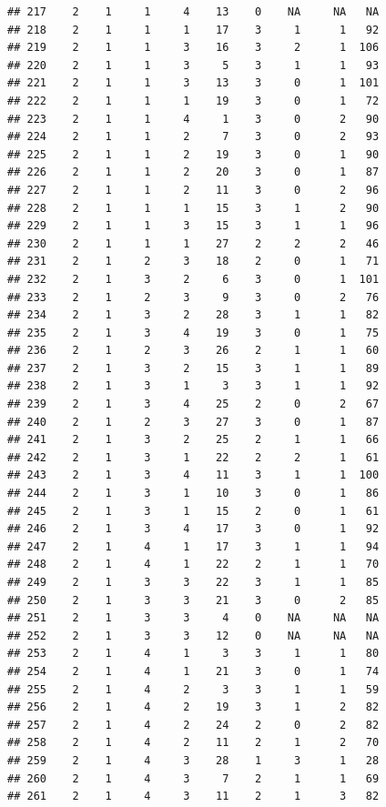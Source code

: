 \documentclass[krantz2,ChapterTOCs]{krantz}\usepackage{knitr}
\begin{document}
\begin{knitrout}
\begin{kframe}
\begin{verbatim}
## 217    2    1     1     4    13    0    NA     NA   NA
## 218    2    1     1     1    17    3     1      1   92
## 219    2    1     1     3    16    3     2      1  106
## 220    2    1     1     3     5    3     1      1   93
## 221    2    1     1     3    13    3     0      1  101
## 222    2    1     1     1    19    3     0      1   72
## 223    2    1     1     4     1    3     0      2   90
## 224    2    1     1     2     7    3     0      2   93
## 225    2    1     1     2    19    3     0      1   90
## 226    2    1     1     2    20    3     0      1   87
## 227    2    1     1     2    11    3     0      2   96
## 228    2    1     1     1    15    3     1      2   90
## 229    2    1     1     3    15    3     1      1   96
## 230    2    1     1     1    27    2     2      2   46
## 231    2    1     2     3    18    2     0      1   71
## 232    2    1     3     2     6    3     0      1  101
## 233    2    1     2     3     9    3     0      2   76
## 234    2    1     3     2    28    3     1      1   82
## 235    2    1     3     4    19    3     0      1   75
## 236    2    1     2     3    26    2     1      1   60
## 237    2    1     3     2    15    3     1      1   89
## 238    2    1     3     1     3    3     1      1   92
## 239    2    1     3     4    25    2     0      2   67
## 240    2    1     2     3    27    3     0      1   87
## 241    2    1     3     2    25    2     1      1   66
## 242    2    1     3     1    22    2     2      1   61
## 243    2    1     3     4    11    3     1      1  100
## 244    2    1     3     1    10    3     0      1   86
## 245    2    1     3     1    15    2     0      1   61
## 246    2    1     3     4    17    3     0      1   92
## 247    2    1     4     1    17    3     1      1   94
## 248    2    1     4     1    22    2     1      1   70
## 249    2    1     3     3    22    3     1      1   85
## 250    2    1     3     3    21    3     0      2   85
## 251    2    1     3     3     4    0    NA     NA   NA
## 252    2    1     3     3    12    0    NA     NA   NA
## 253    2    1     4     1     3    3     1      1   80
## 254    2    1     4     1    21    3     0      1   74
## 255    2    1     4     2     3    3     1      1   59
## 256    2    1     4     2    19    3     1      2   82
## 257    2    1     4     2    24    2     0      2   82
## 258    2    1     4     2    11    2     1      2   70
## 259    2    1     4     3    28    1     3      1   28
## 260    2    1     4     3     7    2     1      1   69
## 261    2    1     4     3    11    2     1      3   82

\end{verbatim}
\end{kframe}
\end{knitrout}
\end{document}
